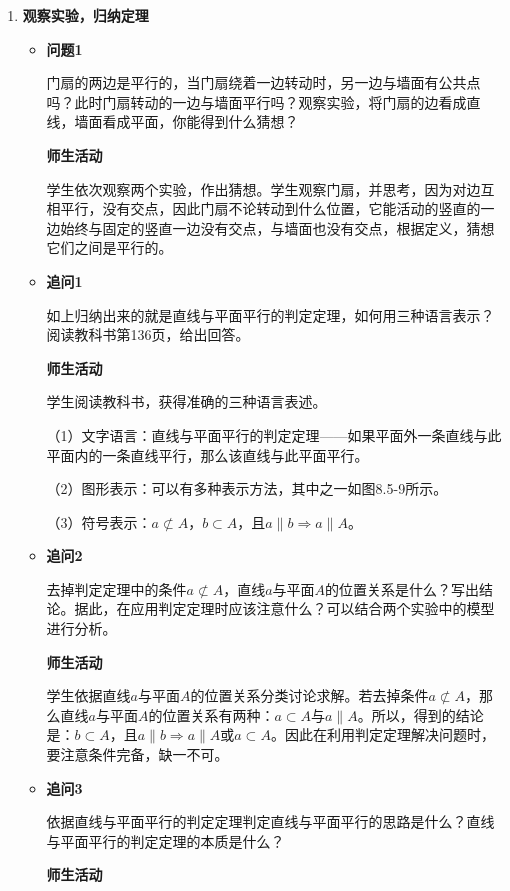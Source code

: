 \documentclass[UTF8,a4paper,12pt,twoside]{ctexart}
\begin{document}
\begin{enumerate}
    \item \textbf{观察实验，归纳定理}

\begin{itemize}
    \item \textbf{问题1}

门扇的两边是平行的，当门扇绕着一边转动时，另一边与墙面有公共点吗？此时门扇转动的一边与墙面平行吗？观察实验，将门扇的边看成直线，墙面看成平面，你能得到什么猜想？

\textbf{师生活动}

学生依次观察两个实验，作出猜想。学生观察门扇，并思考，因为对边互相平行，没有交点，因此门扇不论转动到什么位置，它能活动的竖直的一边始终与固定的竖直一边没有交点，与墙面也没有交点，根据定义，猜想它们之间是平行的。

    \item \textbf{追问1}

如上归纳出来的就是直线与平面平行的判定定理，如何用三种语言表示？阅读教科书第136页，给出回答。

\textbf{师生活动}

学生阅读教科书，获得准确的三种语言表述。

（1）文字语言：直线与平面平行的判定定理——如果平面外一条直线与此平面内的一条直线平行，那么该直线与此平面平行。

（2）图形表示：可以有多种表示方法，其中之一如图8.5-9所示。

（3）符号表示：$a\not\subset A$，$b\subset A$，且$a\parallel b\Rightarrow a\parallel A$。

    \item \textbf{追问2}

去掉判定定理中的条件$a\not\subset A$，直线$a$与平面$A$的位置关系是什么？写出结论。据此，在应用判定定理时应该注意什么？可以结合两个实验中的模型进行分析。

\textbf{师生活动}

学生依据直线$a$与平面$A$的位置关系分类讨论求解。若去掉条件$a\not\subset A$，那么直线$a$与平面$A$的位置关系有两种：$a\subset A$与$a\parallel A$。所以，得到的结论是：$b\subset A$，且$a\parallel b\Rightarrow a\parallel A$或$a\subset A$。因此在利用判定定理解决问题时，要注意条件完备，缺一不可。

    \item \textbf{追问3}

依据直线与平面平行的判定定理判定直线与平面平行的思路是什么？直线与平面平行的判定定理的本质是什么？

\textbf{师生活动}


\end{itemize}
\end{enumerate}
\end{document}
